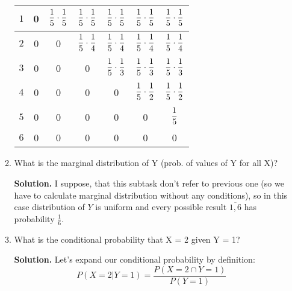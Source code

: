 \documentclass[a4paper, 12pt]{article}
\newcommand{\fract}[2]{\dfrac{\mathstrut #1}{\mathstrut #2}}
\newcommand{\task}[2]{
    \item #1

    \textbf{Solution. } #2
}
\begin{document}
\begin{enumerate}
\begin{enumerate}
{\begin{center}
\begin{tabular}{|c|c|c|c|c|c|c|}
                          \hline
                          $1$     & 0   & $\fract{1}{5} \cdot \fract{1}{5}$ & $\fract{1}{5} \cdot \fract{1}{5}$ & $\fract{1}{5} \cdot \fract{1}{5}$ & $\fract{1}{5} \cdot \fract{1}{5}$ & $\fract{1}{5} \cdot \fract{1}{5}$ \\
                          \hline
                          $2$     & 0   & 0                                 & $\fract{1}{5} \cdot \fract{1}{4}$ & $\fract{1}{5} \cdot \fract{1}{4}$ & $\fract{1}{5} \cdot \fract{1}{4}$ & $\fract{1}{5} \cdot \fract{1}{4}$ \\
                          \hline
                          $3$     & 0   & 0                                 & 0                                 & $\fract{1}{5} \cdot \fract{1}{3}$ & $\fract{1}{5} \cdot \fract{1}{3}$ & $\fract{1}{5} \cdot \fract{1}{3}$ \\
                          \hline
                          $4$     & 0   & 0                                 & 0                                 & 0                                 & $\fract{1}{5} \cdot \fract{1}{2}$ & $\fract{1}{5} \cdot \fract{1}{2}$ \\
                          \hline
                          $5$     & 0   & 0                                 & 0                                 & 0                                 & 0                                 & $\fract{1}{5}$                    \\
                          \hline
                          $6$     & 0   & 0                                 & 0                                 & 0                                 & 0                                 & 0                                 \\
                          \hline
                      \end{tabular}
                  \end{center}
              }
              \task{What is the marginal distribution of Y (prob. of values of Y for all X)?}
              {I suppose, that this subtask don't refer to previous one (so we have to calculate marginal
                  distribution without any conditions), so in this case distribution of $Y$ is
                  uniform and every possible result $\overline{1, 6}$ has probability $\frac{1}{6}$.}
              \task{What is the conditional probability that X = 2 given Y = 1?}
              {
                  Let's expand our conditional probability by definition:
                  \[
                      P(X=2 | Y=1) = \frac{P(X=2 \cap Y=1)}{P(Y=1)}
\]}
\end{enumerate}
\end{enumerate}
\end{document}

